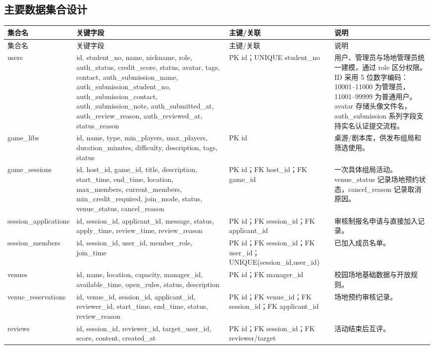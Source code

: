 \documentclass[a4paper]{article}
\begin{document}
\subsection{主要数据集合设计}

\begin{longtable}{P{3.2cm} P{5.4cm} P{4.0cm} P{3.0cm}}
  \toprule
  集合名 & 关键字段 & 主键/关联 & 说明 \\
  \midrule
  \endfirsthead
  \toprule
  集合名 & 关键字段 & 主键/关联 & 说明 \\
  \midrule
  \endhead
  users & id, student\_no, name, nickname, role, auth\_status, credit\_score, status, avatar, tags, contact, auth\_submission\_name, auth\_submission\_student\_no, auth\_submission\_contact, auth\_submission\_note, auth\_submitted\_at, auth\_review\_reason, auth\_reviewed\_at, status\_reason & PK id；UNIQUE student\_no & 用户、管理员与场地管理员统一建模，通过 role 区分权限。ID 采用 5 位数字编码：10001--11000 为管理员，11001--99999 为普通用户。avatar 存储头像文件名，auth\_submission 系列字段支持实名认证提交流程。 \\
  game\_libs & id, name, type, min\_players, max\_players, duration\_minutes, difficulty, description, tags, status & PK id & 桌游/剧本库，供发布组局和筛选使用。 \\
  game\_sessions & id, host\_id, game\_id, title, description, start\_time, end\_time, location, max\_members, current\_members, min\_credit\_required, join\_mode, status, venue\_status, cancel\_reason & PK id；FK host\_id；FK game\_id & 一次具体组局活动。venue\_status 记录场地预约状态，cancel\_reason 记录取消原因。 \\
  session\_applications & id, session\_id, applicant\_id, message, status, apply\_time, review\_time, review\_reason & PK id；FK session\_id；FK applicant\_id & 审核制报名申请与直接加入记录。 \\
  session\_members & id, session\_id, user\_id, member\_role, join\_time & PK id；FK session\_id；FK user\_id；UNIQUE(session\_id,user\_id) & 已加入成员名单。 \\
  venues & id, name, location, capacity, manager\_id, available\_time, open\_rules, status, description & PK id；FK manager\_id & 校园场地基础数据与开放规则。 \\
  venue\_reservations & id, venue\_id, session\_id, applicant\_id, reviewer\_id, start\_time, end\_time, status, review\_reason & PK id；FK venue\_id；FK session\_id；FK applicant\_id & 场地预约审核记录。 \\
  reviews & id, session\_id, reviewer\_id, target\_user\_id, score, content, created\_at & PK id；FK session\_id；FK reviewer/target & 活动结束后互评。 \\

\end{longtable}
\end{document}
